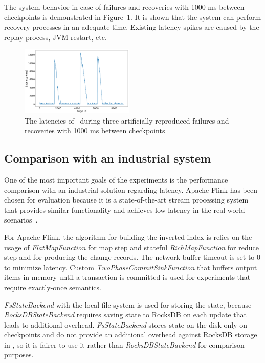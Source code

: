 The system behavior in case of failures and recoveries with 1000 ms between checkpoints is demonstrated in Figure~\ref{recovery}. It is shown that the system can perform recovery processes in an adequate time. Existing latency spikes are caused by the replay process, JVM restart, etc.

\begin{figure}[htbp]
  \centering
  \includegraphics[width=0.48\textwidth]{pics/blink}
  \caption{The latencies of \FlameStream\ during three artificially reproduced failures and recoveries with 1000 ms between checkpoints}
  \label {recovery}
\end{figure}

\subsection{Comparison with an industrial system}
One of the most important goals of the experiments is the performance comparison with an industrial solution regarding latency. Apache Flink has been chosen for evaluation because it is a state-of-the-art stream processing system that provides similar functionality and achieves low latency in the real-world scenarios~\cite{S7530084}. 

For Apache Flink, the algorithm for building the inverted index is relies on  the usage of {\it FlatMapFunction} for map step and stateful {\it RichMapFunction} for reduce step and for producing the change records. The network buffer timeout is set to 0 to minimize latency. Custom {\it TwoPhaseCommitSinkFunction} that buffers output items in memory until a transaction is committed is used for experiments that require exactly-once semantics. 

{\it FsStateBackend} with the local file system is used for storing the state, because {\it RocksDBStateBackend} requires saving state to RocksDB on each update that leads to additional overhead. {\it FsStateBackend} stores state on the disk only on checkpoints and do not provide an additional overhead against RocksDB storage in \FlameStream, so it is fairer to use it rather than {\it RocksDBStateBackend} for comparison purposes.

